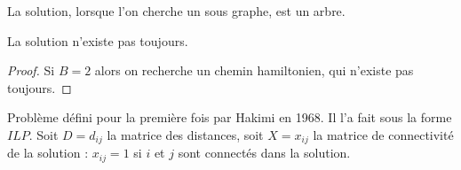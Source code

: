 \documentclass[a4paper,11pt]{thesis}
\begin{document}
\begin{rq}
    La solution, lorsque l'on cherche un sous graphe, est un arbre.
\end{rq}

\begin{rq}
    La solution n'existe pas toujours.
\end{rq}

\begin{proof}
    Si $B=2$ alors on recherche un chemin hamiltonien, qui n'existe pas toujours.
\end{proof}

Problème défini pour la première fois par Hakimi en 1968. Il l'a fait sous la forme $ILP$.
Soit $D = d_{ij}$ la matrice des distances, soit $X = x_{ij}$ la matrice de connectivité de la
solution : $x_{ij} = 1$ si $i$ et $j$ sont connectés dans la solution.
\end{document}
